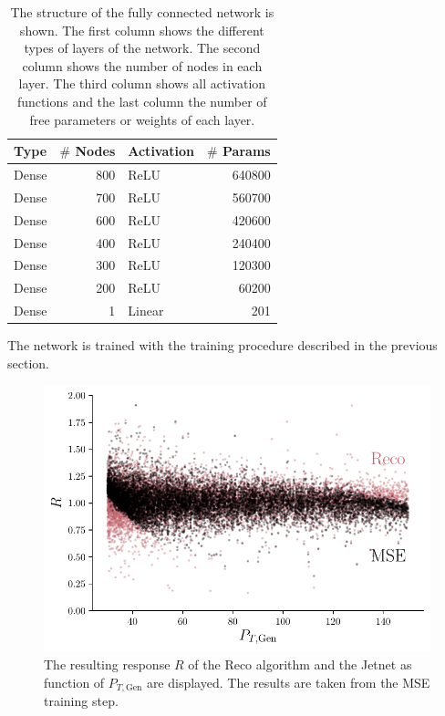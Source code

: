 \documentclass[12pt, a4paper]{thesis}
\begin{document}
\begin{table}[hbtp]
  \centering
  \begin{tabular}{lrlr}
    Type & \(\#\) Nodes & Activation & \(\#\) Params\\
    \hline
    Dense & 800 & ReLU & 640800\\
    Dense & 700 & ReLU & 560700\\
    Dense & 600 & ReLU & 420600\\
    Dense & 400 & ReLU & 240400\\
    Dense & 300 & ReLU & 120300\\
    Dense & 200 & ReLU & 60200\\
    Dense & 1 & Linear & 201\\
  \end{tabular}
  \caption{The structure of the fully connected network is shown. The
    first column shows the different types of layers of the
    network. The second column shows the number of nodes in each
    layer. The third column shows all activation functions and the
    last column the number of free parameters or weights of each
    layer.}
  \label{jet_fcn_structure}
\end{table}

The network is trained with the training procedure described in the
previous section.

\begin{figure}[hbtp]
  \centering
  \includegraphics[width=.9\linewidth]{../images/jetnet_R_scatter.pdf}
  \caption{The resulting response \(R\) of the Reco algorithm and the
    Jetnet as function of \(P_{T, \text{Gen}}\) are
    displayed. The results are taken from the MSE training
      step.}
  \label{jetnet_R_scatter}
\end{figure}
\end{document}
